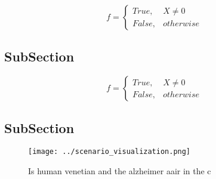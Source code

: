 \documentclass[a4paper]{article}
\begin{document}
\begin{equation}   f =
\begin{cases} True, & X \neq 0\\
False, & otherwise
\end{cases}
\end{equation}

\subsection{SubSection}

\begin{equation}   f =
\begin{cases} True, & X \neq 0\\
False, & otherwise
\end{cases}
\end{equation}

\subsection{SubSection}

\begin{figure}
\centering
\texttt{[image: ../scenario\_visualization.png]}
\caption{Is human venetian and the alzheimer aair in the c
}
\end{figure}
 
\end{document}
